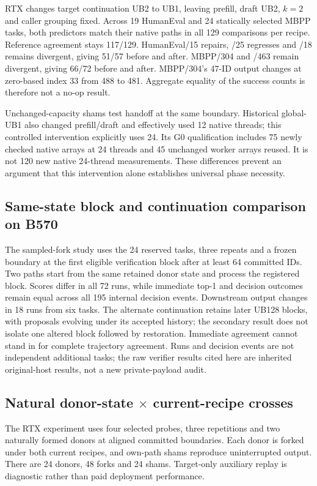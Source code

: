 RTX changes target continuation UB2 to UB1, leaving prefill, draft UB2, $k=2$ and caller grouping fixed. Across 19 HumanEval and 24 statically selected MBPP tasks, both predictors match their native paths in all 129 comparisons per recipe. Reference agreement stays 117/129. HumanEval/15 repairs, /25 regresses and /18 remains divergent, giving 51/57 before and after. MBPP/304 and /463 remain divergent, giving 66/72 before and after. MBPP/304's 47-ID output changes at zero-based index 33 from 488 to 481. Aggregate equality of the success counts is therefore not a no-op result.

Unchanged-capacity shams test handoff at the same boundary. Historical global-UB1 also changed prefill/draft and effectively used 12 native threads; this controlled intervention explicitly uses 24. Its G0 qualification includes 75 newly checked native arrays at 24 threads and 45 unchanged worker arrays reused. It is not 120 new native 24-thread measurements. These differences prevent an argument that this intervention alone establishes universal phase necessity.

\subsection{Same-state block and continuation comparison on B570}
\label{supp:b570_single_block}
The sampled-fork study uses the 24 reserved tasks, three repeats and a frozen boundary at the first eligible verification block after at least 64 committed IDs. Two paths start from the same retained donor state and process the registered block. Scores differ in all 72 runs, while immediate top-1 and decision outcomes remain equal across all 195 internal decision events. Downstream output changes in 18 runs from six tasks. The alternate continuation retains later UB128 blocks, with proposals evolving under its accepted history; the secondary result does not isolate one altered block followed by restoration. Immediate agreement cannot stand in for complete trajectory agreement. Runs and decision events are not independent additional tasks; the raw verifier results cited here are inherited original-host results, not a new private-payload audit.

\subsection{Natural donor-state \texorpdfstring{$\times$}{x} current-recipe crosses}
\label{supp:natural_crosses}
The RTX experiment uses four selected probes, three repetitions and two naturally formed donors at aligned committed boundaries. Each donor is forked under both current recipes, and own-path shams reproduce uninterrupted output. There are 24 donors, 48 forks and 24 shams. Target-only auxiliary replay is diagnostic rather than paid deployment performance.

